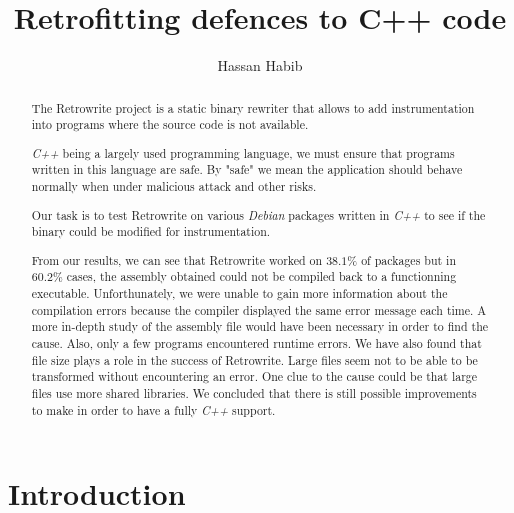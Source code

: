\documentclass[a4paper,11pt,oneside]{report}
\title{Retrofitting defences to C++ code}
\author{Hassan Habib}
\newcommand{\sysname}{Retrowrite\xspace}
\begin{document}
\maketitle

\begin{abstract}
    The \sysname project is a static binary rewriter that allows to add
    instrumentation into programs where the source code is not available.


    \textit{C++} being a largely used programming language, we must ensure that
    programs written in this language are safe. By "safe" we mean the
    application should behave normally when under malicious attack and other
    risks.
     
    Our task is to test \sysname on
    various \textit{Debian} packages written in \textit{C++} to see if the binary
    could be modified for instrumentation.

    From our results, we can see that \sysname worked on $38.1\%$ of packages but in
    $60.2 \%$ cases, the assembly obtained could not be compiled back to a
    functionning executable. Unforthunately, we were unable to gain more
    information about the compilation errors because the compiler displayed the
    same error message each time. A more in-depth study of the assembly file
    would have been necessary in order to find the cause. Also, only a few
    programs encountered runtime errors. We have also found that file size
    plays a role in the success of \sysname. Large files seem not to be able to
    be transformed without encountering an error. One clue to the cause could
    be that large files use more shared libraries. We concluded that there is
    still possible improvements to make in order to have a fully \textit{C++}
    support.

\end{abstract}


\maketoc

\chapter{Introduction}
\end{document}
